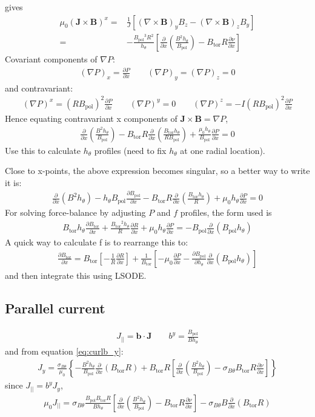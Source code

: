 \documentclass[12pt]{article}
\def\L{\left}
\def\R{\right}
\newcommand{\sbt}{\ensuremath{\sigma_{B\theta}}}
\newcommand{\deriv}[2]{\ensuremath{\frac{\partial #1}{\partial #2}}}
\newcommand{\hthe}{\ensuremath{h_\theta}}
\newcommand{\Bp}{\ensuremath{B_{\text{pol}}}}
\newcommand{\Bt}{\ensuremath{B_{\text{tor}}}}
\newcommand{\ve}[1]{\ensuremath{\boldsymbol{#1}}}
\newcommand{\bvec}{\ve{b}}
\newcommand{\Bvec}{\ve{B}}
\newcommand{\Jvec}{\ve{J}}
\newcommand{\Curl}[1]{\ensuremath{\nabla\times #1 }}
\newcommand{\rbp}{\ensuremath{R\Bp}}
\newcommand{\rbpsq}{\ensuremath{\L(\rbp\R)^2}}
\begin{document}
%
gives
%
\begin{align*}
\mu_0 \L(\Jvec\times\Bvec\R)^x =&
    \frac{1}{J}\L[\L(\Curl{\Bvec}\R)_y B_z -
    \L(\Curl{\Bvec}\R)_z B_y \R]\\ =& -\frac{\Bp^3
    R^2}{\hthe}\L[\deriv{}{x}\L(\frac{B^2\hthe}{\Bp}\R) - \Bt
    R\deriv{\nu}{x}\R]
\end{align*}
%
Covariant components of $\nabla P$:
%
\begin{align*}
\L(\nabla P\R)_x = \deriv{P}{x} \qquad \L(\nabla P\R)_y =
\L(\nabla P\R)_z = 0
\end{align*}
%
and contravariant:
%
\begin{align*}
\L(\nabla P\R)^x = \rbpsq\deriv{P}{x} \qquad \L(\nabla P\R)^y = 0
\qquad \L(\nabla P\R)^z = -I\rbpsq\deriv{P}{x}
\end{align*}
%
Hence equating contravariant x components of $\Jvec\times\Bvec = \nabla P$,
%
\begin{align}
\deriv{}{x}\L(\frac{B^2\hthe}{\Bp}\R) - \Bt
R\deriv{}{x}\L(\frac{\Bt\hthe}{R\Bp}\R) +
\frac{\mu_0\hthe}{\Bp}\deriv{P}{x} = 0
\label{eq:xbalance}
\end{align}
%
Use this to calculate $\hthe$ profiles (need to fix $\hthe$ at one radial
location).

Close to x-points, the above expression becomes singular, so a better way to
write it is:
%
\begin{align*}
\deriv{}{x}\L(B^2\hthe\R) - \hthe\Bp\deriv{\Bp}{x} - \Bt
R\deriv{}{x}\L(\frac{\Bt\hthe}{R}\R) + \mu_0\hthe\deriv{P}{x} = 0
\end{align*}
%
For solving force-balance by adjusting $P$ and $f$ profiles, the form used is
%
\begin{align*}
\Bt\hthe\deriv{\Bt}{x} + \frac{\Bt^2\hthe}{R}\deriv{R}{x} +
\mu_0\hthe\deriv{P}{x} = -\Bp\deriv{}{x}\L(\Bp\hthe\R)
\end{align*}
%
A quick way to calculate f is to rearrange this to:
%
\begin{align*}
\deriv{\Bt}{x} = \Bt\L[-\frac{1}{R}\deriv{R}{x}\R] +
\frac{1}{\Bt}\L[-\mu_0\deriv{P}{x} -
\deriv{\Bp}{\hthe}\deriv{}{x}\L(\Bp\hthe\R)\R]
\end{align*}
%
and then integrate this using LSODE.



\subsection{Parallel current}
%
\begin{align*}
J_{||} = \bvec\cdot\Jvec \qquad b^y = \frac{\Bp}{B\hthe}
\end{align*}
%
and from equation \ref{eq:curlb_y}:
%
\begin{align*}
J_y = \frac{\sbt}{\mu_0}\L\{-\frac{B^2\hthe}{\Bp}\deriv{}{x}\L(\Bt
R\R) + \Bt R\L[\deriv{}{x}\L(\frac{B^2\hthe}{\Bp}\R) - \sbt\Bt
R\deriv{\nu}{x}\R]\R\}
\end{align*}
%
since $J_{||} = b^yJ_y$,
%
\begin{align*}
\mu_0 J_{||} =\sbt\frac{\Bp\Bt
R}{B\hthe}\L[\deriv{}{x}\L(\frac{B^2\hthe}{\Bp}\R) - \Bt
R\deriv{\nu}{x}\R] - \sbt B\deriv{}{x}\L(\Bt R\R)
\end{align*}
%
\end{document}

